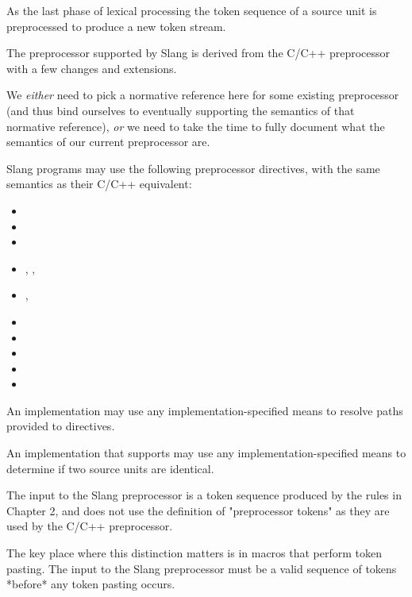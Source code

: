 
As the last phase of lexical processing the token sequence of a source unit is preprocessed to produce a new token stream.

The preprocessor supported by Slang is derived from the C/C++ preprocessor with a few changes and extensions.

\begin{Incomplete}
We \emph{either} need to pick a normative reference here for some existing preprocessor (and thus bind ourselves to eventually supporting the semantics of that normative reference), \emph{or} we need to take the time to fully document what the semantics of our current preprocessor are.
\end{Incomplete}

Slang programs may use the following preprocessor directives, with the same semantics as their C/C++ equivalent:

\begin{itemize}
\item {}
\item {}
\item {}
\item {}, , 
\item {}, 
\item {}
\item {}
\item {}
\item {}
\item {}
\end{itemize}

An implementation may use any implementation-specified means to resolve paths provided to  directives.

An implementation that supports  may use any implementation-specified means to determine if two source units are identical.


The input to the Slang preprocessor is a token sequence produced by the rules in Chapter 2, and does not use the definition of "preprocessor tokens" as they are used by the C/C++ preprocessor.

\begin{Note}
The key place where this distinction matters is in macros that perform token pasting.
The input to the Slang preprocessor must be a valid sequence of tokens *before* any token pasting occurs.
\end{Note}

